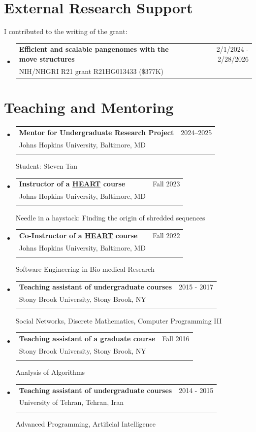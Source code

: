 \documentclass[A4,11pt]{article}
\makeatletter
\newcommand{\CVSubheading}[4]{
  \vspace{-2pt}\item
    \begin{tabular*}{0.97\textwidth}[t]{l@{\extracolsep{\fill}}r}
      \textbf{#1} & #2 \\
      \small#3 & \small #4 \\
    \end{tabular*}\vspace{-7pt}
}
\newcommand{\CVSubHeadingListStart}{\begin{itemize}[leftmargin=0.5cm, label={}]}
\newcommand{\CVSubHeadingListEnd}{\end{itemize}}
\makeatother
\begin{document}
\section{External Research Support}
  I contributed to the writing of the grant:\\
  \CVSubHeadingListStart
  \CVSubheading
  {Efficient and scalable pangenomes with the move structures} {2/1/2024 - 2/28/2026}
  {NIH/NHGRI R21 grant R21HG013433 (\$377K)}{}
  \CVSubHeadingListEnd

    \section{Teaching and Mentoring}
      \CVSubHeadingListStart
      \CVSubheading
      {Mentor for Undergraduate Research Project}{2024--2025}
      {Johns Hopkins University, Baltimore, MD}\\
      {Student: Steven Tan}{}
      \CVSubheading
      {Instructor of a \href{https://engineering.jhu.edu/education/undergraduate-studies/heart-heroic-courses/}{HEART} course}{Fall 2023}
      {Johns Hopkins University, Baltimore, MD}\\
      {Needle in a haystack: Finding the origin of shredded sequences}

      \CVSubheading
      {Co-Instructor of a \href{https://engineering.jhu.edu/education/undergraduate-studies/heart-heroic-courses/}{HEART} course}{Fall 2022}
      {Johns Hopkins University, Baltimore, MD}\\
      {Software Engineering in Bio-medical Research}

      \CVSubheading
          {Teaching assistant of undergraduate courses}{2015 - 2017}
          {Stony Brook University, Stony Brook, NY} \\
          {Social Networks, Discrete Mathematics, Computer Programming III}
        \CVSubheading
          {Teaching assistant of a graduate course}{Fall 2016}
          {Stony Brook University, Stony Brook, NY}\\
          {Analysis of Algorithms}
        \CVSubheading
          {Teaching assistant of undergraduate courses}{2014 - 2015}
          {University of Tehran, Tehran, Iran}\\
          {Advanced Programming, Artificial Intelligence}
        \CVSubHeadingListEnd
      
\end{document}
